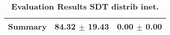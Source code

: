 \begin{table}[htb]
{\begin{tabular}{lll}
\midrule
\textbf{Summary                                  } &                  \phantom{0}84.32 $\pm$ 19.43 &              \phantom{0}0.00 $\pm$ \phantom{0}0.00 \\
\bottomrule
\end{tabular}%
}
\caption{\textbf{Evaluation Results SDT distrib inet.}}
\label{tab:eval-results}
\end{table}
